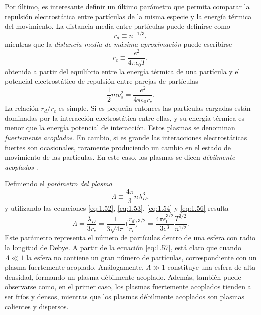 Por último, es interesante definir un último parámetro que permita comparar la repulsión electrostática entre partículas de la misma especie y la energía térmica del movimiento. La distancia media entre partículas puede definirse como 
\begin{equation}\label{eq:1.53}
  r_{d} \equiv n^{-1/3},
\end{equation}
mientras que la \emph{distancia media de máxima aproximación} puede escribirse
\begin{equation}\label{eq:1.54}
  r_{c} \equiv \frac{e^{2}}{4 \pi \epsilon_{0}T},
\end{equation}
obtenida a partir del equilibrio entre la energía térmica de una partícula y el potencial electrostático de repulsión entre parejas de partículas
\begin{equation}\label{eq:1.55}
  \frac{1}{2}mv^{2}_{s} = \frac{e^{2}}{4 \pi \epsilon_{0}r_{c}}.
\end{equation}
La relación $r_{d}/r_{c}$ es simple. Si es pequeña entonces las partículas cargadas están dominadas por la interacción electrostática entre ellas, y su energía térmica es menor que la energía potencial de interacción. Estos plasmas se denominan \emph{fuertemente acoplados}. En cambio, si es grande las interacciones electrostáticas fuertes son ocasionales, raramente produciendo un cambio en el estado de movimiento de las partículas. En este caso, los plasmas se dicen \emph{débilmente acoplados} \autocite{Fitzpatrick2022}.

Definiendo el \emph{parámetro del plasma} 
\begin{equation}\label{eq:1.56}
  \Lambda \equiv \frac{4 \pi}{3}n \lambda^{3}_{D},
\end{equation}
y utilizando las ecuaciones \eqref{eq:1.52}, \eqref{eq:1.53}, \eqref{eq:1.54} y \eqref{eq:1.56} resulta
\begin{equation}\label{eq:1.57}
  \Lambda = \frac{\lambda_{D}}{3r_{c}} = \frac{1}{3\sqrt{4 \pi}}\bigg(\frac{r_{d}}{r_{c}}\bigg)^{3/2} = \frac{4 \pi \epsilon^{3/2}_{0}}{3e^{3}}\frac{T^{3/2}}{n^{1/2}}.
\end{equation}
Este parámetro representa el número de partículas dentro de una esfera con radio la longitud de Debye. A partir de la ecuación \eqref{eq:1.57}, está claro que cuando $\Lambda \ll 1$ la esfera no contiene un gran número de partículas, correspondiente con un plasma fuertemente acoplado. Análogamente, $\Lambda \gg 1$ constituye una esfera de alta densidad, formando un plasma débilmente acoplado. Además, también puede observarse como, en el primer caso, los plasmas fuertemente acoplados tienden a ser fríos y densos, mientras que los plasmas débilmente acoplados son plasmas calientes y dispersos.

